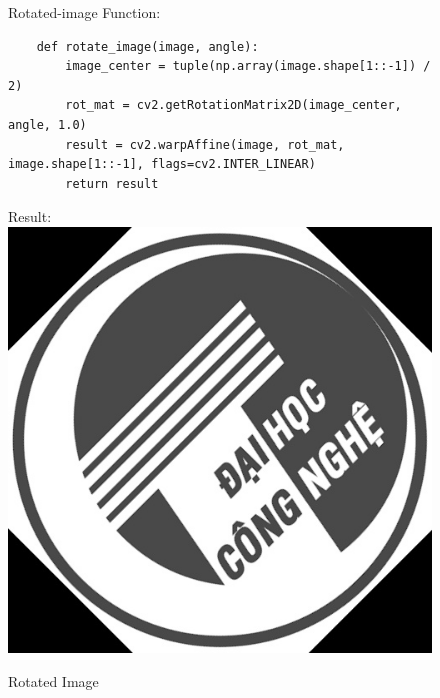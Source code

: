 \documentclass{article}
\begin{document}
\begin{figure}[htbp]
Rotated-image Function:
    \begin{verbatim}
    def rotate_image(image, angle):
        image_center = tuple(np.array(image.shape[1::-1]) / 2)
        rot_mat = cv2.getRotationMatrix2D(image_center, angle, 1.0)
        result = cv2.warpAffine(image, rot_mat, image.shape[1::-1], flags=cv2.INTER_LINEAR)
        return result
    \end{verbatim}

Result:
  \centering
  \includegraphics[width=\linewidth]{lena_gray_rotated.jpg}
  \caption{Rotated Image}
  \label{fig:my_image}
\end{figure}
\end{document}
